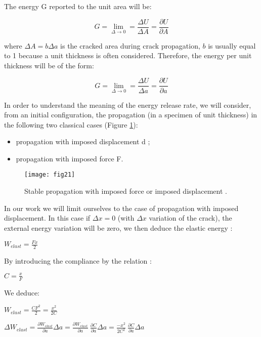 The energy G reported to the unit area will be:

\begin{equation}
	G = \lim_{\Delta \to 0}= \frac{\Delta U}{\Delta A}= \frac{\partial U}{\partial A}
	\label{eq:eq122}
\end{equation}

\noindent where $\Delta A=b\Delta a$  is the cracked area during crack propagation, $b$ is usually equal to 1 because a unit thickness is often considered. Therefore, the energy per unit thickness will be of the form:

\begin{equation}
	G = \lim_{\Delta \to 0}= \frac{\Delta U}{\Delta a}= \frac{\partial U}{\partial a}
	\label{eq:eq123}
\end{equation}

In order to understand the meaning of the energy release rate, we will consider, from an initial configuration, the propagation (in a specimen of unit thickness) in the following two classical cases (Figure \ref{fig:fig21}):

\begin{itemize}
	\item propagation with imposed displacement d ; 
	\item propagation with imposed force F.
\end{itemize}

\begin{figure}[htp]
	\centering
	\texttt{[image: fig21]}
	\caption{Stable propagation with imposed force or imposed displacement \citep{Zeghloul2001phd}.}
	\label{fig:fig21}
\end{figure}

In our work we will limit ourselves to the case of propagation with imposed displacement. In this case if $\Delta x=0$ (with $\Delta x$ variation of the crack), the external energy variation will be zero, we then deduce the elastic energy :

$W_{elast}=\displaystyle\frac{Fx}{2}$

By introducing the compliance by the relation :

$C=\displaystyle\frac{x}{F}$

We deduce:

$W_{elast}=\displaystyle\frac{CF^2}{2}=\frac{x^2}{2C}$

$\Delta W_{elast}=\displaystyle\frac{\partial W_{elast}}{\partial a}\Delta a=\frac{\partial W_{elast}}{\partial a}\ \frac{\partial C}{\partial a}\Delta a=\frac{-x^2}{2C^2}\ \frac{\partial C}{\partial a}\Delta a$

